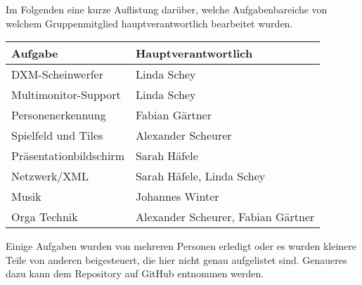 
Im Folgenden eine kurze Auflistung darüber, welche Aufgabenbareiche von welchem Gruppenmitglied hauptverantwortlich bearbeitet wurden.

\vspace{1em}

\begin{center}
\begin{tabular}[hc]{|l|l|}
\hline
\textbf{Aufgabe} & \textbf{Hauptverantwortlich}\\
\hline
DXM-Scheinwerfer&Linda Schey\\
Multimonitor-Support& Linda Schey\\
Personenerkennung& Fabian Gärtner\\
Spielfeld und Tiles& Alexander Scheurer\\
Präsentationbildschirm& Sarah Häfele\\
Netzwerk/XML& Sarah Häfele, Linda Schey\\
Musik&Johannes Winter\\
Orga Technik& Alexander Scheurer, Fabian Gärtner\\
\hline
\end{tabular}
\end{center}

\vspace{1em}

Einige Aufgaben wurden von mehreren Personen erledigt oder es wurden kleinere Teile von anderen beigesteuert, die hier nicht genau aufgelistet sind. Genaueres dazu kann dem Repository auf GitHub entnommen werden.
